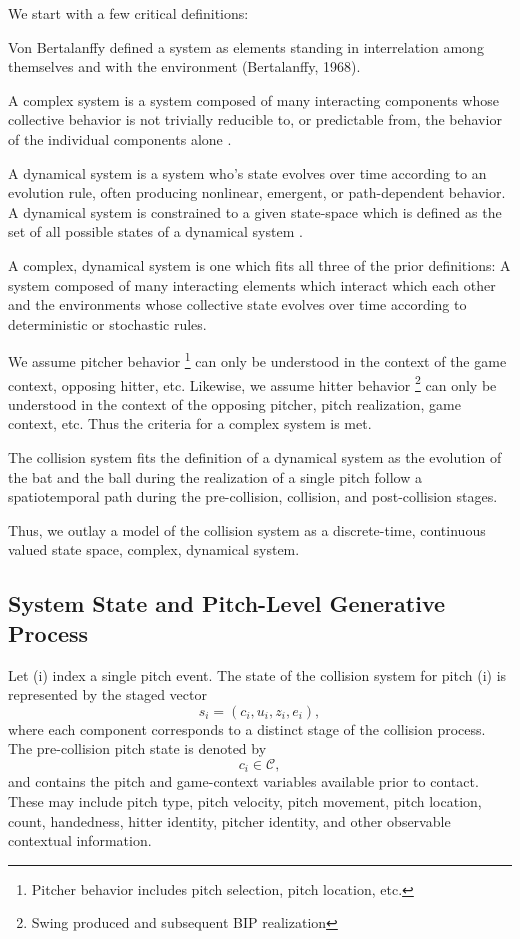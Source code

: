 \documentclass[11pt]{article}
\begin{document}
We start with a few critical definitions:

Von Bertalanffy defined a system as elements standing in interrelation among themselves and with the environment (Bertalanffy, 1968).

A complex system is a system composed of many interacting components whose collective behavior is not trivially reducible to, or predictable from, the behavior of the individual components alone \cite{newman2011complex}. 

A dynamical system is a system who's state evolves over time according to an evolution rule, often producing nonlinear, emergent, or path-dependent behavior. A dynamical system is constrained to a given state-space which is defined as the set of all possible states of a dynamical system \cite{terman2008state}. 

A complex, dynamical system is one which fits all three of the prior definitions: A system composed of many interacting elements which interact which each other and the environments whose collective state evolves over time according to deterministic or stochastic rules.

We assume pitcher behavior \footnote{Pitcher behavior includes pitch selection, pitch location, etc.} can only be understood in the context of the game context, opposing hitter, etc. Likewise, we assume hitter behavior \footnote{Swing produced and subsequent BIP realization} can only be understood in the context of the opposing pitcher, pitch realization, game context, etc. Thus the criteria for a complex system is met.

The collision system fits the definition of a dynamical system as the evolution of the bat and the ball during the realization of a single pitch follow a spatiotemporal path during the pre-collision, collision, and post-collision stages. 

Thus, we outlay a model of the collision system as a discrete-time, continuous valued state space, complex, dynamical system.

\subsection{System State and Pitch-Level Generative Process}

Let (i) index a single pitch event. The state of the collision system for pitch (i) is represented by the staged vector
\begin{equation}
s_i = (c_i,u_i,z_i,e_i),
\end{equation}
where each component corresponds to a distinct stage of the collision process. The pre-collision pitch state is denoted by
\begin{equation}
c_i \in \mathcal{C},
\end{equation}
and contains the pitch and game-context variables available prior to contact. These may include pitch type, pitch velocity, pitch movement, pitch location, count, handedness, hitter identity, pitcher identity, and other observable contextual information.
\end{document}
